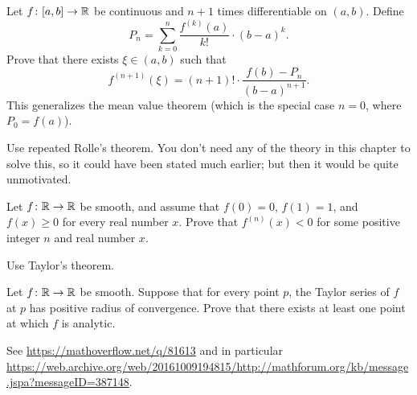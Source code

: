 \begin{dproblem}
	Let $f \colon [a,b] \to \mathbb R$ be continuous
	and $n+1$ times differentiable on $(a,b)$.
	Define
	\[ P_n = \sum_{k=0}^n \frac{f^{(k)}(a)}{k!} \cdot (b-a)^k. \]
	Prove that there exists $\xi \in (a,b)$ such that
	\[ f^{(n+1)}(\xi) = (n+1)! \cdot \frac{f(b) - P_n}{(b-a)^{n+1}}. \]
	This generalizes the mean value theorem
	(which is the special case $n = 0$, where $P_0 = f(a)$).
	\begin{hint}
		Use repeated Rolle's theorem.
		You don't need any of the theory in this chapter to solve this,
		so it could have been stated much earlier;
		but then it would be quite unmotivated.
	\end{hint}
\end{dproblem}

\begin{problem}
	[Putnam 2018 A5]
	\yod
	Let $f \colon \mathbb R \to \mathbb R$ be smooth,
	and assume that $f(0) = 0$, $f(1) = 1$, and $f(x) \ge 0$
	for every real number $x$.
	Prove that $f^{(n)}(x) < 0$ for some positive integer $n$
	and real number $x$.
	\begin{hint}
		Use Taylor's theorem.
	\end{hint}
\end{problem}

\begin{problem}
	\kurumi
	Let $f \colon \mathbb R \to \mathbb R$ be smooth.
	Suppose that for every point $p$,
	the Taylor series of $f$ at $p$ has positive radius of convergence.
	Prove that there exists at least one point at which $f$ is analytic.
	\begin{sol}
		See \url{https://mathoverflow.net/q/81613}
		and in particular
		\url{https://web.archive.org/web/20161009194815/http://mathforum.org/kb/message.jspa?messageID=387148}.
	\end{sol}
\end{problem}
